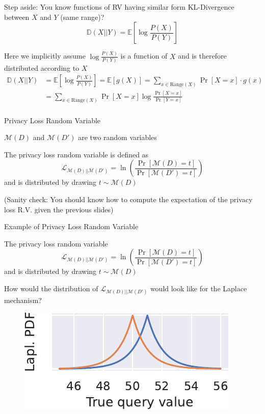 \documentclass[12pt,aspectratio=169,handout]{beamer}
\begin{document}
\begin{frame}{Step aside: You know functions of RV having similar form}
KL-Divergence between $X$ and $Y$ (same range)?
$$
\mathbb{D}(X || Y) = \mathbb{E} \left[
\log \frac{P(X)}{P(Y)}
\right]
$$

Here we implicitly assume $\log \frac{P(X)}{P(Y)}$ is a function of $X$ and is therefore distributed according to $X$
$$
\begin{aligned}
\mathbb{D}(X || Y) &= \mathbb{E} \left[
\log \frac{P(X)}{P(Y)}
\right]
= \mathbb{E}[g(X)] = 
\sum_{x \in \text{Range}(X)} \Pr[X = x] \cdot g(x) \\
&= \sum_{x \in \text{Range}(X)} \Pr[X = x] \log \frac{\Pr[X = x]}{\Pr[Y = x]} \\
\end{aligned}
$$
\end{frame}


\begin{frame}{Privacy Loss Random Variable}

$\mathcal{M}(D)$ and $\mathcal{M}(D')$ are two random variables

The privacy loss random variable is defined as
$$
\mathcal{L}_{\mathcal{M}(D) || \mathcal{M}(D')}
=
\ln \left( \frac{
\Pr[\mathcal{M}(D) = t]
}{
\Pr[\mathcal{M}(D') = t]
}
\right)
$$
and is distributed by drawing $t \sim \mathcal{M}(D)$

(Sanity check: You should know how to compute the expectation of the privacy loss R.V. given the previous slides)
\end{frame}

\begin{frame}{Example of Privacy Loss Random Variable}

\begin{block}{The privacy loss random variable}
$$
\mathcal{L}_{\mathcal{M}(D) || \mathcal{M}(D')}
=
\ln \left( \frac{
\Pr[\mathcal{M}(D) = t]
}{
\Pr[\mathcal{M}(D') = t]
}
\right)
$$
and is distributed by drawing $t \sim \mathcal{M}(D)$
\end{block}

How would the distribution of $\mathcal{L}_{\mathcal{M}(D) || \mathcal{M}(D')}$ would look like for the Laplace mechanism?
\begin{figure}
\centering
\includegraphics[width=0.5\linewidth]{img/laplace-pdfs-01.pdf}
\end{figure}

\end{frame}
\end{document}
